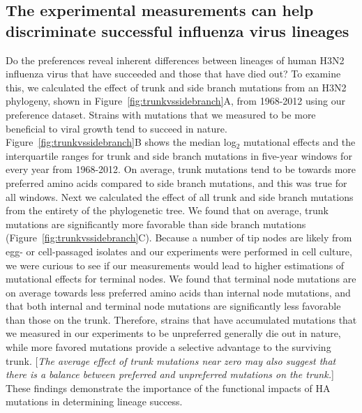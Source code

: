 \documentclass[11pt]{article}
\newcommand{\comment}[1]{{\color{red}[\textsl{#1}]}}
\begin{document}
\subsection*{The experimental measurements can help discriminate successful influenza virus lineages}
Do the preferences reveal inherent differences between lineages of human H3N2 influenza virus that have succeeded and those that have died out?
To examine this, we calculated the effect of trunk and side branch mutations from an H3N2 phylogeny, shown in Figure~\ref{fig:trunkvssidebranch}A, from 1968-2012 using our preference dataset. 
Strains with mutations that we measured to be more beneficial to viral growth tend to succeed in nature.
Figure~\ref{fig:trunkvssidebranch}B shows the median log$_{2}$ mutational effects and the interquartile ranges for trunk and side branch mutations in five-year windows for every year from 1968-2012. 
On average, trunk mutations tend to be towards more preferred amino acids compared to side branch mutations, and this was true for all windows.
Next we calculated the effect of all trunk and side branch mutations from the entirety of the phylogenetic tree.
We found that on average, trunk mutations are significantly more favorable than side branch mutations (Figure~\ref{fig:trunkvssidebranch}C).
Because a number of tip nodes are likely from egg- or cell-passaged isolates and our experiments were performed in cell culture, we were curious to see if our measurements would lead to higher estimations of mutational effects for terminal nodes.
We found that terminal node mutations are on average towards less preferred amino acids than internal node mutations, and that both internal and terminal node mutations are significantly less favorable than those on the trunk.
Therefore, strains that have accumulated mutations that we measured in our experiments to be unpreferred generally die out in nature, while more favored mutations  provide a selective advantage to the surviving trunk.
\comment{The average effect of trunk mutations near zero may also suggest that there is a balance between preferred and unpreferred mutations on the trunk.}
These findings demonstrate the importance of the functional impacts of HA mutations in determining lineage success.
\end{document}
